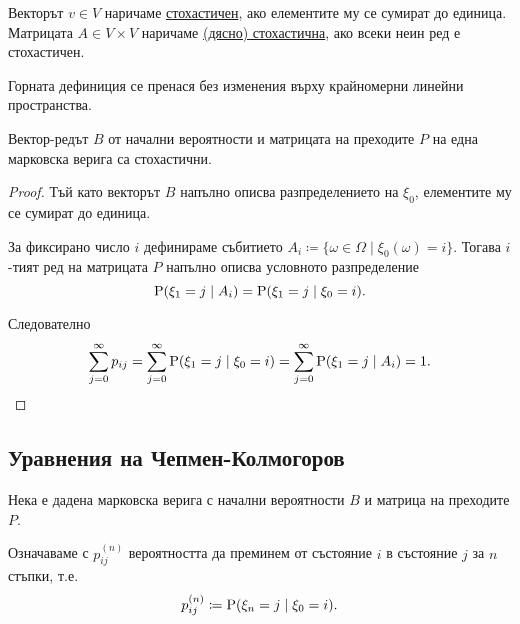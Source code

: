 \documentclass[numbers=endperiod, DIV=15, bibliography=totocnumbered]{scrartcl}
\begin{document}
\begin{definition}
  Векторът $v \in V$ наричаме \uline{стохастичен}, ако елементите му се сумират до единица. Матрицата $A \in V \times V$ наричаме \uline{(дясно) стохастична}, ако всеки неин ред е стохастичен.
\end{definition}

\begin{note}
  Горната дефиниция се пренася без изменения върху крайномерни линейни пространства.
\end{note}

\begin{proposition}
  Вектор-редът $B$ от начални вероятности и матрицата на преходите $P$ на една марковска верига са стохастични.
\end{proposition}
\begin{proof}
  Тъй като векторът $B$ напълно описва разпределението на $\xi_0$, елементите му се сумират до единица.

  За фиксирано число $i$ дефинираме събитието $A_i \coloneqq \{ \omega \in \Omega \mid \xi_0(\omega) = i \}$. Тогава $i$-тият ред на матрицата $P$ напълно описва условното разпределение
  \begin{displaymath}
    \operatorname{P}(\xi_1 = j \mid A_i)
    =
    \operatorname{P}(\xi_1 = j \mid \xi_0 = i).
  \end{displaymath}

  Следователно
  \begin{displaymath}
    \sum_{j=0}^\infty p_{ij}
    =
    \sum_{j=0}^\infty \operatorname{P}(\xi_1 = j \mid \xi_0 = i)
    =
    \sum_{j=0}^\infty \operatorname{P}(\xi_1 = j \mid A_i)
    =
    1.
  \end{displaymath}
\end{proof}

\subsection{Уравнения на Чепмен-Колмогоров}

Нека е дадена марковска верига с начални вероятности $B$ и матрица на преходите $P$.

Означаваме с $p^{(n)}_{ij}$ вероятността да преминем от състояние $i$ в състояние $j$ за $n$ стъпки, т.е.
\begin{displaymath}
  p^{(n)}_{ij} \coloneqq \operatorname{P}(\xi_n = j \mid \xi_0 = i).
\end{displaymath}
\end{document}
